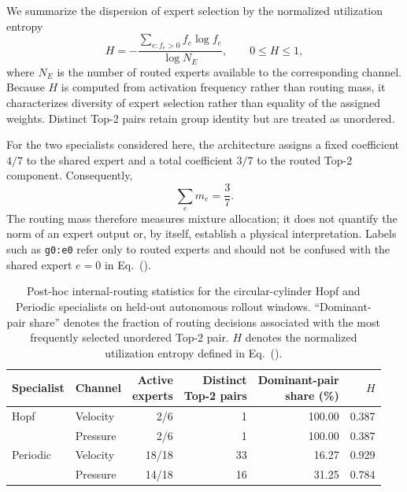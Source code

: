 We summarize the dispersion of expert selection by the normalized utilization entropy
\begin{equation}
  H
  =
  -\frac{
    \sum_{e:f_e>0} f_e\log f_e
  }{
    \log N_E
  },
  \qquad
  0\le H\le1,
  \label{eq:app_routing_entropy}
\end{equation}
where $N_E$ is the number of routed experts available to the corresponding channel. Because $H$ is computed from activation frequency rather than routing mass, it characterizes diversity of expert selection rather than equality of the assigned weights. Distinct Top-2 pairs retain group identity but are treated as unordered.

For the two specialists considered here, the architecture assigns a fixed coefficient $4/7$ to the shared expert and a total coefficient $3/7$ to the routed Top-2 component. Consequently,
\begin{equation}
  \sum_e m_e=\frac{3}{7}.
\end{equation}
The routing mass therefore measures mixture allocation; it does not quantify the norm of an expert output or, by itself, establish a physical interpretation.
Labels such as \texttt{g0:e0} refer only to routed experts and should not be confused with the shared expert $e=0$ in
Eq.~().

\par
\begin{table}[H]
\centering
\caption{
Post-hoc internal-routing statistics for the circular-cylinder Hopf and Periodic specialists on held-out autonomous rollout windows. ``Dominant-pair share'' denotes the fraction of routing decisions associated with the most frequently selected unordered Top-2 pair. $H$ denotes the normalized utilization entropy defined in Eq.~().
}
\label{tab:internal_routing_summary}
\small
\setlength{\tabcolsep}{5pt}
\begin{tabular}{@{}llrrrr@{}}
\toprule
Specialist & Channel & \shortstack{Active\\experts} & \shortstack{Distinct\\Top-2 pairs} & \shortstack{Dominant-pair\\share (\%)} & $H$ \\
\midrule
Hopf & Velocity & 2/6 & 1 & 100.00 & 0.387 \\
     & Pressure & 2/6 & 1 & 100.00 & 0.387 \\
\addlinespace
Periodic & Velocity & 18/18 & 33 & 16.27 & 0.929 \\
         & Pressure & 14/18 & 16 & 31.25 & 0.784 \\
\bottomrule
\end{tabular}
\end{table}
\par


